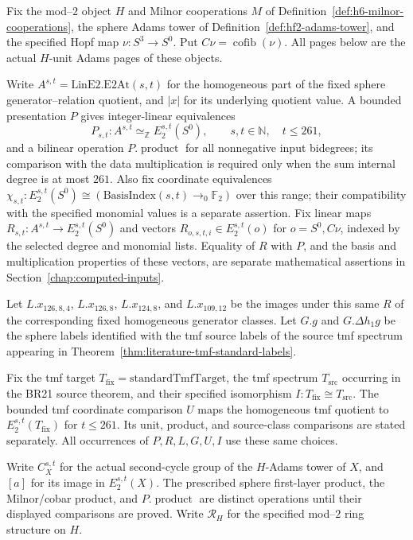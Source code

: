 \begin{definition}
  \label{def:computation-fixed-bindings}
  \notready
  Fix the mod--$2$ object $H$ and Milnor cooperations $M$ of
  Definition~\ref{def:h6-milnor-cooperations}, the sphere Adams tower
  of Definition~\ref{def:hf2-adams-tower}, and the specified Hopf map
  $\nu:S^3\to S^0$. Put
  $C\nu=\operatorname{cofib}(\nu)$. All pages below are the actual
  $H$-unit Adams pages of these objects.

  Write $A^{s,t}=\mathrm{LinE2.E2At}(s,t)$ for the homogeneous part of
  the fixed sphere generator--relation quotient, and $|x|$ for its
  underlying quotient value. A bounded presentation $P$ gives
  integer-linear equivalences
  \[
    P_{s,t}:A^{s,t}\simeq_{\mathbb Z}E_2^{s,t}(S^0),
       \qquad s,t\in\mathbb N,\quad t\le261,
  \]
  and a bilinear operation $P.\operatorname{product}$ for all nonnegative
  input bidegrees; its comparison with the data multiplication is required
  only when the sum internal degree is at most $261$.
  Also fix coordinate equivalences
  $\chi_{s,t}:E_2^{s,t}(S^0)\cong
  (\mathrm{BasisIndex}(s,t)\to_0\mathbb F_2)$ over this range;
  their compatibility with the specified monomial values is a separate
  assertion. Fix linear maps
  $R_{s,t}:A^{s,t}\to E_2^{s,t}(S^0)$ and vectors
  $R_{o,s,t,i}\in E_2^{s,t}(o)$ for $o=S^0,C\nu$, indexed by the
  selected degree and monomial lists. Equality of $R$ with $P$, and the
  basis and multiplication properties of these vectors, are separate
  mathematical assertions in Section~\ref{chap:computed-inputs}.

  Let $L.x_{126,8,4}$, $L.x_{126,8}$, $L.x_{124,8}$, and
  $L.x_{109,12}$ be the images under this same $R$ of the corresponding
  fixed homogeneous generator classes. Let $G.g$ and
  $G.\Delta h_1g$ be the sphere labels identified with the tmf source
  labels of the source tmf spectrum appearing in
  Theorem~\ref{thm:literature-tmf-standard-labels}.

  Fix the tmf target $T_{\mathrm{fix}}=\mathrm{standardTmfTarget}$,
  the tmf spectrum $T_{\mathrm{src}}$ occurring in the BR21 source
  theorem, and their specified isomorphism
  $I:T_{\mathrm{fix}}\cong T_{\mathrm{src}}$.
  The bounded tmf coordinate comparison $U$ maps the homogeneous
  tmf quotient to $E_2^{s,t}(T_{\mathrm{fix}})$ for $t\le261$.
  Its unit, product, and source-class comparisons are stated separately.
  All occurrences of $P,R,L,G,U,I$ use these same choices.

  Write $C_X^{s,t}$ for the actual second-cycle group of the $H$-Adams
  tower of $X$, and $[a]$ for its image in $E_2^{s,t}(X)$.
  The prescribed sphere first-layer product, the Milnor/cobar product,
  and $P.\operatorname{product}$ are distinct operations until their
  displayed comparisons are proved. Write $\mathcal R_H$ for the
  specified mod--$2$ ring structure on $H$.
\end{definition}

